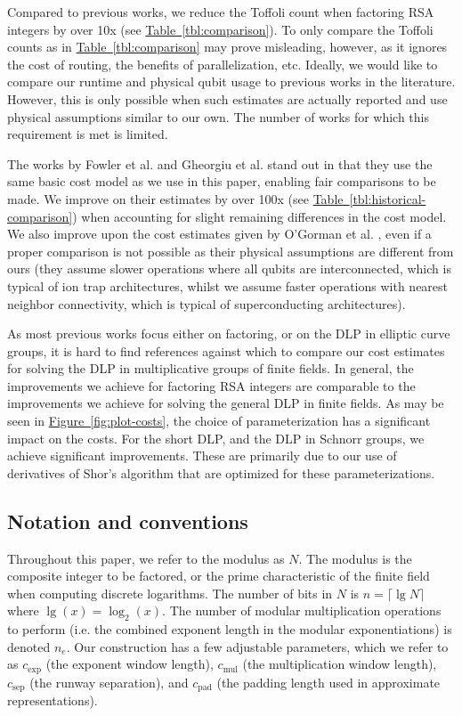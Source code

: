 \documentclass[superscriptaddress,notitlepage,longbibliography]{revtex4-1}
\theoremstyle{definition}
\theoremstyle{definition}
\newcommand{\fig}[1]{\hyperref[fig:#1]{Figure~\ref*{fig:#1}}}
\newcommand{\tbl}[1]{\hyperref[tbl:#1]{Table~\ref*{tbl:#1}}}
\newcommand{\lenexp}{{n_e}}
\newcommand{\gexp}{{c_{\text{exp}}}}
\newcommand{\gmul}{{c_{\text{mul}}}}
\newcommand{\gsep}{{c_{\text{sep}}}}
\newcommand{\gpad}{{c_{\text{pad}}}}
\begin{document}
Compared to previous works, we reduce the Toffoli count when factoring RSA integers by over 10x (see \tbl{comparison}).
To only compare the Toffoli counts as in \tbl{comparison} may prove misleading, however, as it ignores the cost of routing, the benefits of parallelization, etc.
Ideally, we would like to compare our runtime and physical qubit usage to previous works in the literature.
However, this is only possible when such estimates are actually reported and use physical assumptions similar to our own.
The number of works for which this requirement is met is limited.

The works by Fowler et al. \cite{fowler2012surfacecodereview} and Gheorgiu et al. \cite{gheorghiu2019cryptanalysis} stand out in that they use the same basic cost model as we use in this paper, enabling fair comparisons to be made.
We improve on their estimates by over 100x (see \tbl{historical-comparison}) when accounting for slight remaining differences in the cost model.
We also improve upon the cost estimates given by O'Gorman et al. \cite{ogorman2017factories}, even if a proper comparison is not possible as their physical assumptions are different from ours (they assume slower operations where all qubits are interconnected, which is typical of ion trap architectures, whilst we assume faster operations with nearest neighbor connectivity, which is typical of superconducting architectures).

As most previous works focus either on factoring, or on the DLP in elliptic curve groups, it is hard to find references against which to compare our cost estimates for solving the DLP in multiplicative groups of finite fields.
In general, the improvements we achieve for factoring RSA integers are comparable to the improvements we achieve for solving the general DLP in finite fields.
As may be seen in \fig{plot-costs}, the choice of parameterization has a significant impact on the costs.
For the short DLP, and the DLP in Schnorr groups, we achieve significant improvements.
These are primarily due to our use of derivatives of Shor's algorithm that are optimized for these parameterizations.

\subsection{Notation and conventions}

Throughout this paper, we refer to the modulus as $N$.
The modulus is the composite integer to be factored, or the prime characteristic of the finite field when computing discrete logarithms.
The number of bits in $N$ is $n = \lceil \lg N \rceil$ where $\lg(x) = \log_2(x)$.
The number of modular multiplication operations to perform (i.e. the combined exponent length in the modular exponentiations) is denoted $\lenexp$.
Our construction has a few adjustable parameters, which we refer to as $\gexp$ (the exponent window length), $\gmul$ (the multiplication window length), $\gsep$ (the runway separation), and $\gpad$ (the padding length used in approximate representations).
\end{document}
